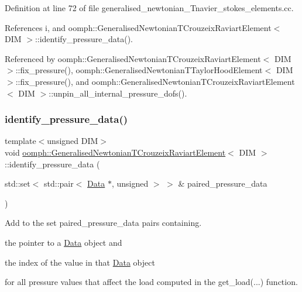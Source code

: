 Definition at line 72 of file generalised\+\_\+newtonian\+\_\+\+Tnavier\+\_\+stokes\+\_\+elements.\+cc.



References i, and oomph\+::\+Generalised\+Newtonian\+T\+Crouzeix\+Raviart\+Element$<$ D\+I\+M $>$\+::identify\+\_\+pressure\+\_\+data().



Referenced by oomph\+::\+Generalised\+Newtonian\+T\+Crouzeix\+Raviart\+Element$<$ D\+I\+M $>$\+::fix\+\_\+pressure(), oomph\+::\+Generalised\+Newtonian\+T\+Taylor\+Hood\+Element$<$ D\+I\+M $>$\+::fix\+\_\+pressure(), and oomph\+::\+Generalised\+Newtonian\+T\+Crouzeix\+Raviart\+Element$<$ D\+I\+M $>$\+::unpin\+\_\+all\+\_\+internal\+\_\+pressure\+\_\+dofs().

\mbox{\label{classoomph_1_1GeneralisedNewtonianTCrouzeixRaviartElement_a9b7ff8a20c83f19dd4154105b4d11487}} 
\subsubsection{\texorpdfstring{identify\+\_\+pressure\+\_\+data()}{identify\_pressure\_data()}}
{\footnotesize\ttfamily template$<$unsigned D\+IM$>$ \\
void \hyperlink{classoomph_1_1GeneralisedNewtonianTCrouzeixRaviartElement}{oomph\+::\+Generalised\+Newtonian\+T\+Crouzeix\+Raviart\+Element}$<$ D\+IM $>$\+::identify\+\_\+pressure\+\_\+data (\begin{DoxyParamCaption}\item[{std\+::set$<$ std\+::pair$<$ \hyperlink{classoomph_1_1Data}{Data} $\ast$, unsigned $>$ $>$ \&}]{paired\+\_\+pressure\+\_\+data }\end{DoxyParamCaption})\hspace{0.3cm}{\ttfamily [virtual]}}



Add to the set {\ttfamily paired\+\_\+pressure\+\_\+data} pairs containing. 


\begin{DoxyItemize}
\item the pointer to a \hyperlink{classoomph_1_1Data}{Data} object and
\item the index of the value in that \hyperlink{classoomph_1_1Data}{Data} object
\end{DoxyItemize}for all pressure values that affect the load computed in the {\ttfamily get\+\_\+load}(...) function.

